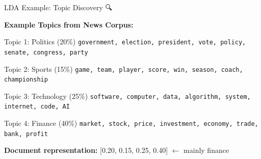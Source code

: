 \documentclass[aspectratio=169]{beamer}
\begin{document}
\begin{frame}{LDA Example: Topic Discovery 🔍}
\begin{center}
\textbf{Example Topics from News Corpus:}
\end{center}

\vspace{1em}

\begin{block}{Topic 1: Politics (20\%)}
\texttt{government, election, president, vote, policy, senate, congress, party}
\end{block}

\begin{block}{Topic 2: Sports (15\%)}
\texttt{game, team, player, score, win, season, coach, championship}
\end{block}

\begin{block}{Topic 3: Technology (25\%)}
\texttt{software, computer, data, algorithm, system, internet, code, AI}
\end{block}

\begin{block}{Topic 4: Finance (40\%)}
\texttt{market, stock, price, investment, economy, trade, bank, profit}
\end{block}

\vspace{0.5em}
\textbf{Document representation:} [0.20, 0.15, 0.25, 0.40] $\leftarrow$ mainly finance
\end{frame}
\end{document}
